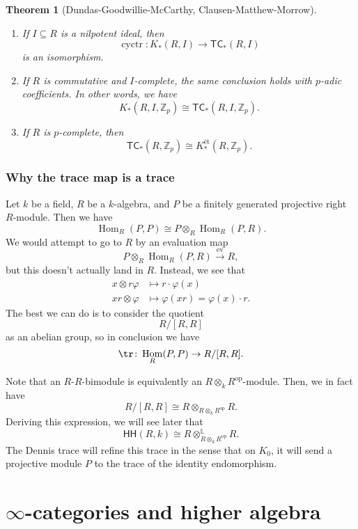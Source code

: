 \documentclass[10pt, oneside]{memoir}
\theoremstyle{definition}
\theoremstyle{remark}
\theoremstyle{plain}
\newtheorem*{thm*}{Theorem}
\theoremstyle{definition}
\theoremstyle{remark}
\newcommand{\Z}{\mathbb{Z}}
\renewcommand{\L}{\mathbb{L}}
\newcommand{\on}[1]{\operatorname{#1}}
\newcommand{\ms}[1]{\mathsf{#1}}
\newcommand{\1}{\mathbf{1}}
\newcommand{\2}{\mathbf{2}}
\newcommand{\3}{\mathbf{3}}
\newcommand{\TC}{\ms{TC}}
\newcommand{\HH}{\ms{HH}}
\DeclareMathOperator{\Hom}{Hom}
\DeclareMathOperator{\ev}{ev}
\DeclareMathOperator{\op}{op}
\begin{document}
\begin{thm*}[Dundas-Goodwillie-McCarthy, Clausen-Matthew-Morrow]\leavevmode
    \begin{enumerate}
        \item If $I \subseteq R$ is a nilpotent ideal, then 
        \[ \on{cyctr} \colon K_*(R,I) \to \TC_*(R, I) \]
        is an isomorphism.
        \item If $R$ is commutative and $I$-complete, the same conclusion holds with $p$-adic coefficients. In other words, we have
        \[
            K_*(R, I, \Z_p) \cong \TC_*(R, I, \Z_p).
        \]
        \item If $R$ is $p$-complete, then 
        \[ \TC_*(R, \Z_p) \cong K_*^{\text{\'et}}(R, \Z_p). \]
    \end{enumerate}
\end{thm*}

\subsection*{Why the trace map is a trace}%
\label{sub:Why the trace map is a trace}

Let $k$ be a field, $R$ be a $k$-algebra, and $P$ be a finitely generated projective right $R$-module. Then we have
\[ \Hom_R(P, P) \cong P \otimes_R \Hom_R(P, R). \]
We would attempt to go to $R$ by an evaluation map
\[ P \otimes_R \Hom_R(P, R) \xrightarrow{\ev} R, \]
but this doesn't actually land in $R$. Instead, we see that
\begin{align*}
    x \otimes r \varphi &\mapsto r \cdot \varphi(x) \\
    xr \otimes \varphi &\mapsto \varphi(xr) = \varphi(x) \cdot r.
\end{align*}
The best we can do is to consider the quotient
\[ R / [R,R] \]
as an abelian group, so in conclusion we have
\[ \tr \colon \Hom_R(P, P) \to R/[R,R]. \]

Note that an $R$-$R$-bimodule is equivalently an $R \otimes_k R^{\op}$-module. Then, we in fact have
\[ R/[R,R] \cong R \otimes_{R \otimes_k R^{\op}} R. \]
Deriving this expression, we will see later that
\[ \HH(R, k) \cong R \otimes^{\L}_{R \otimes_k R^{\op}} R. \]
The Dennis trace will refine this trace in the sense that on $K_0$, it will send a projective module $P$ to the trace of the identity endomorphism.

\chapter{\texorpdfstring{$\infty$-categories and higher algebra}{Infinity-categories and higher algebra}}\thispagestyle{firstpage}
\end{document}
